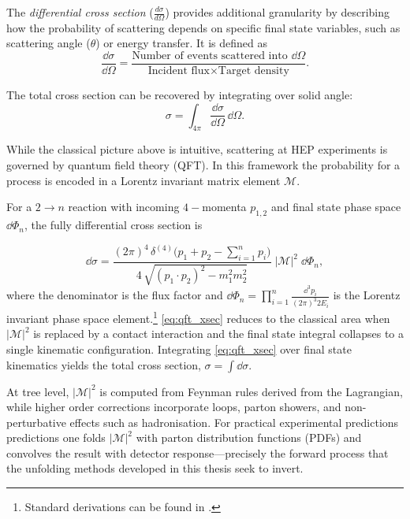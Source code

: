 \begin{definition}
    \begin{definition}
        The \emph{differential cross section} (\(\frac{d\sigma}{d\Omega}\)) provides additional granularity by describing how the probability of scattering depends on specific final state variables, such as scattering angle (\(\theta\)) or energy transfer.
        It is defined as
        \begin{equation}
            \frac{\dd\sigma}{\dd\Omega} = \frac{\text{Number of events scattered into } \dd\Omega}{\text{Incident flux} \times \text{Target density}}.
        \end{equation}
    \end{definition}

    The total cross section can be recovered by integrating over solid angle:
    \begin{equation}
    \sigma = \int_{4\pi} \frac{\dd\sigma}{\dd\Omega} \, \dd\Omega.
    \end{equation}

    While the classical picture above is intuitive, scattering at HEP experiments is governed by quantum field theory (QFT).
    In this framework the probability for a process is encoded in a Lorentz invariant matrix element \(\mathcal{M}\).
    
    For a \(2 \to n\) reaction with incoming \(4-\)momenta \(p_{1,2}\) and final state phase space \( \dd\Phi_n \), the fully differential cross section is

    \begin{equation}
      \dd\sigma =
      \frac{(2\pi)^4 \, \delta^{(4)}\!\bigl(p_1 + p_2 - \sum_{i=1}^n p_i\bigr)}
           {4\,\sqrt{(p_1\!\cdot\!p_2)^2 - m_1^2 m_2^2}}
      \; |\mathcal{M}|^2 \;
      \dd\Phi_n,
      \label{eq:qft_xsec}
    \end{equation}
    where the denominator is the flux factor and \(\dd\Phi_n = \prod_{i=1}^{n} \tfrac{\dd^3 p_i}{(2\pi)^3 2E_i}\) is the Lorentz invariant phase space element.\footnote{Standard derivations can be found in \cite{peskin_introduction_1995,Navas2024ReviewPhysics, Hollik2014Quantum978-1-107-03473-0, QuantumAssessment}.
    }
    \cref{eq:qft_xsec} reduces to the classical area when \(|\mathcal{M}|^2\) is replaced by a contact interaction and the final state integral collapses to a single kinematic configuration.
    Integrating \cref{eq:qft_xsec} over final state kinematics yields the total cross section, \(\sigma = \int \dd\sigma\).
    
    At tree level, \(|\mathcal{M}|^2\) is computed from Feynman rules derived from the Lagrangian, while higher order corrections incorporate loops, parton showers, and non-perturbative effects such as hadronisation.
    For practical experimental predictions predictions one folds \(|\mathcal{M}|^2\) with parton distribution functions (PDFs) and convolves the result with detector response---precisely the forward process that the unfolding methods developed in this thesis seek to invert.


\end{definition}
